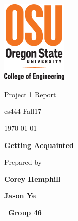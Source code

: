 \documentclass[onecolumn, draftclsnofoot,10pt, compsoc]{IEEEtran}
\def \OperatingSystemTwo{Group 46}
\def \GroupMemberOne{Corey Hemphill}
\def \GroupMemberTwo{Jason Ye}
\def \HomeworkAssignmentOne{Getting Acquainted}
\def \DocType{	%
				Project 1 Report
				}
\begin{document}
\begin{titlepage}
    \begin{singlespace}
    	\includegraphics[height=4cm]{coe_v_spot1}
        \hfill 
        \par\vspace{.2in}
        \centering
        \scshape{
            \huge  \DocType \par
           	\huge cs444 Fall17 \par
            {\large\today}\par
            \vspace{.5in}
            \textbf{\Huge\HomeworkAssignmentOne}\par
            \vspace{.5in}
           
            {\large Prepared by }\par
           	\textbf{\GroupMemberOne}\par
            \textbf{\GroupMemberTwo}\par
   
            \vspace{5pt}
            
            \textbf{\Huge\ \OperatingSystemTwo}\par
            }
            \vspace{60pt}
        
        \begin{abstract}
        \end{abstract} 
        
    \end{singlespace}
\end{titlepage}
\newpage
{}
\tableofcontents
\clearpage
\end{document}
